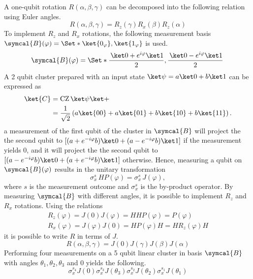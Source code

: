 A one-qubit rotation \(R(\alpha, \beta, \gamma)\) can be decomposed into the following relation using Euler angles\cite{daSilva2013}.
\begin{equation}
  R(\alpha, \beta, \gamma) = R_z(\gamma) R_x(\beta) R_z(\alpha)
\end{equation}
To implement \(R_z\) and \(R_x\) rotations, the following measurement basis \(\symcal{B}(\varphi) = \Set*{\ket{0_\varphi},\ket{1_\varphi} }\) is used.
\begin{equation}
  \symcal{B}(\varphi) = \Set*{\frac{\,\ket0 + e^{i\varphi}\ket1}{2}, \frac{\,\ket0 - e^{i\varphi}\ket1}{2} \,}
\end{equation}
A 2 qubit cluster prepared with an input state \(\ket\psi = a\ket0 + b\ket1\) can be expressed as
\begin{align}
  \ket{C} &= \operatorname{CZ} \ket\psi\ket+ \\
  &= \frac{1}{\sqrt2}\left( a \ket{00} + a \ket{01} + b \ket{10} + b\ket{11}\right).
\end{align}
a measurement of the first qubit of the cluster in \(\symcal{B}\) will project the the second qubit to \([(a + e^{-i\varphi}b)\ket0 + (a - e^{-i\varphi}b)\ket1]\) if the measurement yields 0, and it will project the the second qubit to \([(a - e^{-i\varphi}b)\ket0 + (a + e^{-i\varphi}b)\ket1]\) otherwise. Hence, measuring a qubit on \(\symcal{B}(\varphi)\) results in the unitary transformation
\begin{equation}
  \sigma_x^s \, H P(\varphi) = \sigma_x^s \, J(\varphi),
\end{equation}
where \(s\) is the measurement outcome and \(\sigma_x^s\) is the by-product operator. By measuring \(\symcal{B}\) with different angles, it is possible to implement \(R_z\) and \(R_x\) rotations. Using the relations
\begin{gather}
  R_z(\varphi) = J(0)J(\varphi) = H H P(\varphi) = P(\varphi) \\
  R_x(\varphi) = J(\varphi)J(0) = H P(\varphi) H = H R_z(\varphi) H 
\end{gather}
it is possible to write \(R\) in terms of \(J\).
\begin{equation}
  R(\alpha, \beta, \gamma) = J(0)J(\gamma)J(\beta)J(\alpha)
\end{equation}
Performing four measurements on a 5 qubit linear cluster in basis \(\symcal{B}\) with angles \(\theta_1, \theta_2, \theta_3\) and 0 yields the following.
\begin{equation}
  \sigma_x^{s_4} J(0) \sigma_x^{s_3} J(\theta_3) \sigma_x^{s_2} J(\theta_2) \sigma_x^{s_1} J(\theta_1) 
\end{equation}
